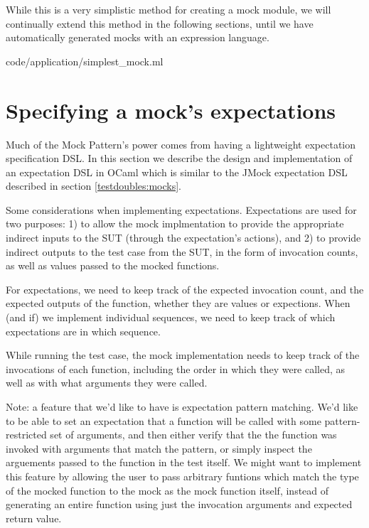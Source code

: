 While this is a very simplistic method for creating a mock module, we
will continually extend this method in the following sections, until
we have automatically generated mocks with an expression language.

 {code/application/simplest_mock.ml}

\section{Specifying a mock's expectations}
\label{application:expectations}

Much of the Mock Pattern's power comes from having a lightweight
expectation specification DSL. In this section we describe the design
and implementation of an expectation DSL in OCaml which is similar to
the JMock expectation DSL described in section
\ref{testdoubles:mocks}.

Some considerations when implementing expectations. Expectations are
used for two purposes: 1) to allow the mock implmentation to provide
the appropriate indirect inputs to the SUT (through the expectation's
actions), and 2) to provide indirect outputs to the test case from the
SUT, in the form of invocation counts, as well as values passed to the
mocked functions.

For expectations, we need to keep track of the expected invocation
count, and the expected outputs of the function, whether they are
values or expections. When (and if) we implement individual sequences,
we need to keep track of which expectations are in which sequence.

While running the test case, the mock implementation needs to keep
track of the invocations of each function, including the order in
which they were called, as well as with what arguments they were
called.

Note: a feature that we'd like to have is expectation pattern
matching. We'd like to be able to set an expectation that a function
will be called with some pattern-restricted set of arguments, and then
either verify that the the function was invoked with arguments that
match the pattern, or simply inspect the arguements passed to the
function in the test itself. We might want to implement this feature
by allowing the user to pass arbitrary funtions which match the type
of the mocked function to the mock as the mock function itself,
instead of generating an entire function using just the invocation
arguments and expected return value.

